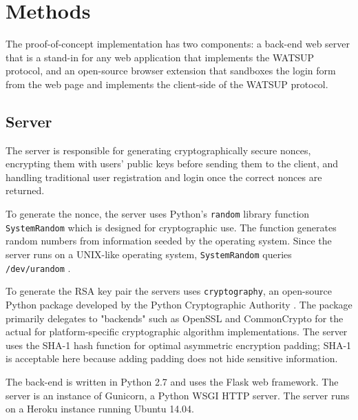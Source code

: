 \section{Methods}
\label{sec:methods}

The proof-of-concept implementation has two components: a back-end web server that is a stand-in for any web application that implements the WATSUP protocol, and an open-source browser extension that sandboxes the login form from the web page and implements the client-side of the WATSUP protocol.

\subsection{Server}

The server is responsible for generating cryptographically secure nonces, encrypting them with users' public keys before sending them to the client, and handling traditional user registration and login once the correct nonces are returned.

To generate the nonce, the server uses Python's \texttt{random} library function \texttt{SystemRandom} which is designed for cryptographic use. The function generates random numbers from information seeded by the operating system. Since the server runs on a UNIX-like operating system, \texttt{SystemRandom} queries \texttt{/dev/urandom} \cite{Python:2017, Python:2017:2}.

To generate the RSA key pair the servers uses \texttt{cryptography}, an open-source Python package developed by the Python Cryptographic Authority \cite{PCA:2017}. The package primarily delegates to "backends" such as OpenSSL and CommonCrypto for the actual for platform-specific cryptographic algorithm implementations. The server uses the SHA-1 hash function for optimal asymmetric encryption padding; SHA-1 is acceptable here because adding padding does not hide sensitive information.

The back-end is written in Python 2.7 and uses the Flask web framework. The server is an instance of Gunicorn, a Python WSGI HTTP server. The server runs on a Heroku instance running Ubuntu 14.04.
